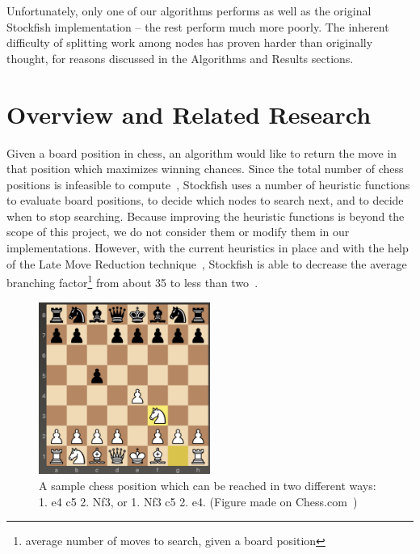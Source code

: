 \documentclass{article}
\begin{document}
Unfortunately, only one of our algorithms performs as well as the original
Stockfish implementation -- the rest perform much more poorly.
The inherent difficulty
of splitting work among nodes has proven harder than originally thought, for
reasons discussed in the Algorithms and Results sections.

\section{Overview and Related Research}\label{Overview}
Given a board position in chess, an algorithm would like to return the move in
that position which maximizes winning chances. Since the total number of chess
positions is infeasible to compute~\cite{chesscom}, Stockfish uses a number of
heuristic functions to evaluate board positions, to decide which nodes to
search next, and to decide when to stop searching.
Because improving the heuristic functions is beyond the scope of this project, we do
not consider them or modify them in our implementations.
However, with the current heuristics in place and with the help of the Late Move
Reduction technique~\cite{wiki:LMR},
Stockfish is able to decrease the average branching
factor\footnote{average number of moves to search, given a board position} from
about 35 to less than two~\cite{stockfish:code}.

\begin{figure}[t]
	\includegraphics[width=0.5\textwidth]{transposition}
	\caption{A sample chess position which can be reached in two different
	ways: 1. e4 c5 2. Nf3, or 1. Nf3 c5 2. e4. (Figure made on
	Chess.com~\cite{chesscom:fig})}
	\label{fig:transpositions}
\end{figure}
\end{document}

